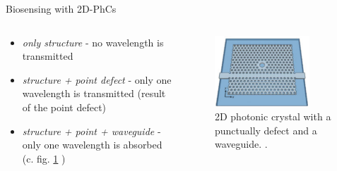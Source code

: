 \begin{frame}{Biosensing with 2D-PhCs}

  \begin{columns}

    \begin{column}{0.49\textwidth}
    \begin{itemize}
      \setlength\itemsep{1.2em}
      \item{\emph{only structure} - no wavelength is transmitted }
      \item{\emph{structure + point defect} - only one wavelength is transmitted (result of the point defect)}
      \item{\emph{structure + point + waveguide} - only one wavelength is absorbed (c. fig. \ref{fig: 2d_photonic_crystal} )}
    \end{itemize}
    \end{column}

    \begin{column}{0.49\textwidth}
    \begin{figure}
      \centering
      \includegraphics[width=0.8\textwidth]{./bilder/2dphc_waveguide_point_defect.png}
      \caption{2D photonic crystal with a punctually defect and a waveguide. \cite{nano}.}
      \label{fig: 2d_photonic_crystal}
    \end{figure}
  \end{column}

  \end{columns}

\end{frame}



